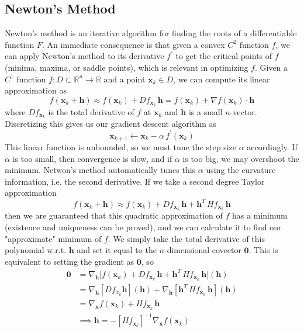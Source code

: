 \documentclass{article}
\begin{document}
  \subsection{Newton's Method}

    Newton's method is an iterative algorithm for finding the roots of a differentiable function $F$. An immediate consequence is that given a convex $C^2$ function $f$, we can apply Newton's method to its derivative $f^\prime$ to get the critical points of $f$ (minima, maxima, or saddle points), which is relevant in optimizing $f$. Given a $C^1$ function $f: D \subset \mathbb{R}^n \longrightarrow \mathbb{R}$ and a point $\mathbf{x}_k \in D$, we can compute its linear approximation as 
    \begin{equation}
      f(\mathbf{x}_k + \mathbf{h}) \approx f(\mathbf{x}_k) + D f_{\mathbf{x}_k} \, \mathbf{h} = f(\mathbf{x}_k) + \nabla f(\mathbf{x}_k) \cdot \mathbf{h}
    \end{equation}
    where $D f_{\mathbf{x}_k}$ is the total derivative of $f$ at $\mathbf{x}_k$ and $\mathbf{h}$ is a small $n$-vector. Discretizing this gives us our gradient descent algorithm as 
    \begin{equation}
      \mathbf{x}_{k+1} \gets \mathbf{x}_k - \alpha \, f^\prime(\mathbf{x}_k)
    \end{equation}
    This linear function is unbounded, so we must tune the step size $\alpha$ accordingly. If $\alpha$ is too small, then convergence is slow, and if $\alpha$ is too big, we may overshoot the minimum. Netwon's method automatically tunes this $\alpha$ using the curvature information, i.e. the second derivative. If we take a second degree Taylor approximation 
    \begin{equation}
      f(\mathbf{x}_k + \mathbf{h}) \approx f(\mathbf{x}_k) + D f_{\mathbf{x}_k} \, \mathbf{h} + \mathbf{h}^T \, H f_{\mathbf{x}_k} \, \mathbf{h}
    \end{equation}
    then we are guaranteed that this quadratic approximation of $f$ has a minimum (existence and uniqueness can be proved), and we can calculate it to find our "approximate" minimum of $f$. We simply take the total derivative of this polynomial w.r.t. $\mathbf{h}$ and set it equal to the $n$-dimensional covector $\mathbf{0}$. This is equivalent to setting the gradient as $\mathbf{0}$, so 
    \begin{align*}
      \mathbf{0} & = \nabla_\mathbf{h} \big[ f(\mathbf{x}_k) + D f_{\mathbf{x}_k} \, \mathbf{h} + \mathbf{h}^T \, H f_{\mathbf{x}_k} \, \mathbf{h} \big] (\mathbf{h}) \\
      & = \nabla_\mathbf{h} [ D f_{x_k} \mathbf{h} ] (\mathbf{h}) + \nabla_\mathbf{h} [\mathbf{h}^T \, H f_{\mathbf{x}_k} \, \mathbf{h}] (\mathbf{h}) \\
      & = \nabla_\mathbf{x} f(\mathbf{x}_k) + H f_{\mathbf{x}_k} \, \mathbf{h} \\
      & \implies \mathbf{h} = - [H f_{\mathbf{x}_k}]^{-1} \nabla_\mathbf{x} f(\mathbf{x}_k) 
    \end{align*}
\end{document}
